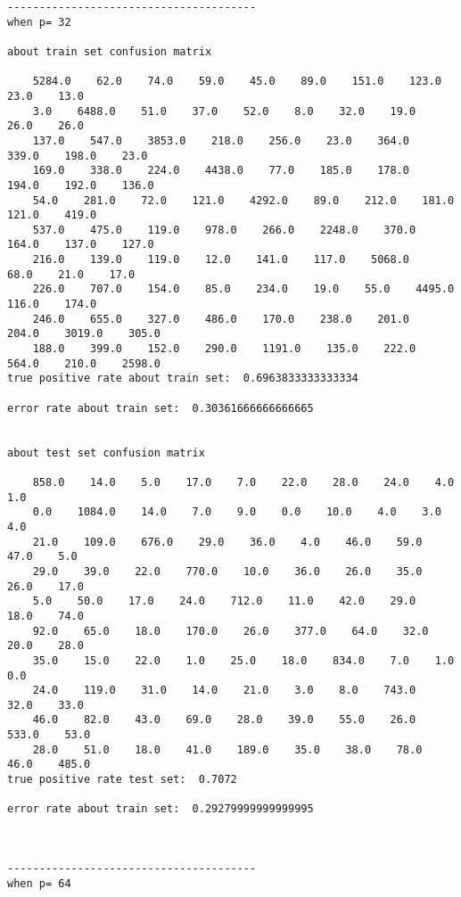 \documentclass[11pt]{article}
\begin{document}
    \begin{Verbatim}[commandchars=\\\{\}]



---------------------------------------
when p= 32

about train set confusion matrix

    5284.0    62.0    74.0    59.0    45.0    89.0    151.0    123.0    23.0    13.0
    3.0    6488.0    51.0    37.0    52.0    8.0    32.0    19.0    26.0    26.0
    137.0    547.0    3853.0    218.0    256.0    23.0    364.0    339.0    198.0    23.0
    169.0    338.0    224.0    4438.0    77.0    185.0    178.0    194.0    192.0    136.0
    54.0    281.0    72.0    121.0    4292.0    89.0    212.0    181.0    121.0    419.0
    537.0    475.0    119.0    978.0    266.0    2248.0    370.0    164.0    137.0    127.0
    216.0    139.0    119.0    12.0    141.0    117.0    5068.0    68.0    21.0    17.0
    226.0    707.0    154.0    85.0    234.0    19.0    55.0    4495.0    116.0    174.0
    246.0    655.0    327.0    486.0    170.0    238.0    201.0    204.0    3019.0    305.0
    188.0    399.0    152.0    290.0    1191.0    135.0    222.0    564.0    210.0    2598.0
true positive rate about train set:  0.6963833333333334

error rate about train set:  0.30361666666666665


about test set confusion matrix

    858.0    14.0    5.0    17.0    7.0    22.0    28.0    24.0    4.0    1.0
    0.0    1084.0    14.0    7.0    9.0    0.0    10.0    4.0    3.0    4.0
    21.0    109.0    676.0    29.0    36.0    4.0    46.0    59.0    47.0    5.0
    29.0    39.0    22.0    770.0    10.0    36.0    26.0    35.0    26.0    17.0
    5.0    50.0    17.0    24.0    712.0    11.0    42.0    29.0    18.0    74.0
    92.0    65.0    18.0    170.0    26.0    377.0    64.0    32.0    20.0    28.0
    35.0    15.0    22.0    1.0    25.0    18.0    834.0    7.0    1.0    0.0
    24.0    119.0    31.0    14.0    21.0    3.0    8.0    743.0    32.0    33.0
    46.0    82.0    43.0    69.0    28.0    39.0    55.0    26.0    533.0    53.0
    28.0    51.0    18.0    41.0    189.0    35.0    38.0    78.0    46.0    485.0
true positive rate test set:  0.7072

error rate about train set:  0.29279999999999995



---------------------------------------
when p= 64


\end{Verbatim}
\end{document}
